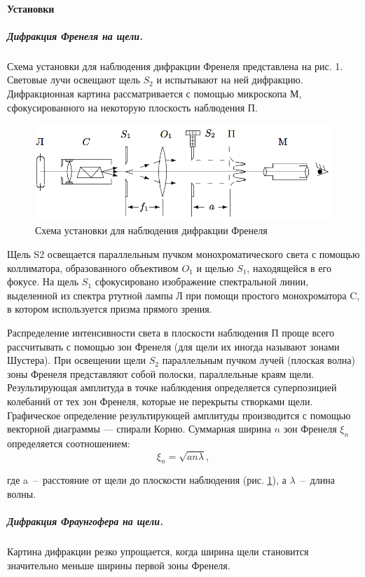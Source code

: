\documentclass[12pt]{article}
\newcommand{\lw}{\linewidth}
\begin{document}
	\paragraph{Установки}
	\subparagraph{Дифракция Френеля на щели.}
	Схема установки для наблюдения дифракции Френеля представлена на рис. 1. Световые лучи освещают щель $S_2$ и испытывают на ней дифракцию. Дифракционная картина рассматривается с помощью микроскопа М, сфокусированного на некоторую плоскость наблюдения П.
	
	\begin{figure}[h]
		\centering
		\includegraphics[width = \lw]{img1}
		\caption{Схема установки для наблюдения дифракции Френеля}
		\label{fig:scheme}
	\end{figure}
	
	
	Щель S2 освещается параллельным пучком монохроматического света с помощью коллиматора, образованного объективом $O_1$ и щелью $S_1$, находящейся в его фокусе. На щель $S_1$ сфокусировано изображение спектральной линии, выделенной из спектра ртутной лампы Л при помощи простого монохроматора C, в котором используется призма прямого зрения. 
	
	Распределение интенсивности света в плоскости наблюдения П проще всего рассчитывать с помощью зон Френеля (для щели их иногда называют зонами Шустера). При освещении щели $S_2$ параллельным пучком лучей (плоская волна) зоны Френеля представляют собой полоски, параллельные краям щели. Результирующая амплитуда в точке наблюдения определяется суперпозицией колебаний от тех зон Френеля, которые не перекрыты створками щели. Графическое определение результирующей амплитуды производится с помощью векторной диаграммы — спирали Корню. Суммарная ширина $n$ зон Френеля $\xi_n$ определяется соотношением: 
	\[ \xi_n = \sqrt{an\lambda}, \]
	
	где a~--~расстояние от щели до плоскости наблюдения (рис. \ref{fig:scheme}), а $\lambda$~--~длина волны.
	
	
	\subparagraph{Дифракция Фраунгофера на щели.}
	Картина дифракции резко упрощается, когда ширина щели становится значительно меньше ширины первой зоны Френеля. 
	
\end{document}
